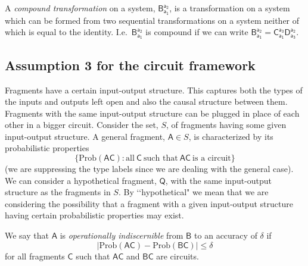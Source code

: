 \documentclass[10pt]{article}
\begin{document}
A \emph{compound transformation} on a system, $\mathsf{B_{a_1}^{a_2}}$,  is a transformation on a system which can be formed from two sequential transformations on a system neither of which is equal to the identity.  I.e.\ $\mathsf{B_{a_1}^{a_2}}$ is compound if we can write $\mathsf{B_{a_1}^{a_2}}=\mathsf{C_{a_1}^{a_3}} \mathsf{D_{a_3}^{a_2}}$.


\subsection{Assumption 3 for the circuit framework}\label{assumptionthreesec}

Fragments have a certain input-output structure. This captures both the types of the inputs and outputs left open and also the causal structure between them.  Fragments with the same input-output structure can be plugged in place of each other in a bigger circuit.  Consider the set, $S$, of fragments having some given input-output structure.
A general fragment, $\mathsf{A} \in S$, is characterized by its probabilistic properties
\begin{equation}
\{\text{Prob}(\mathsf{AC}): \text{all}~\mathsf{C}~\text{such that}~ \mathsf{AC}~\text{is a circuit}\}
\end{equation}
(we are suppressing the type labels since we are dealing with the general case).
We can consider a hypothetical fragment, $\mathsf{Q}$, with the same input-output structure as the fragments in $S$. By \lq\lq hypothetical" we mean that we are considering the possibility that a fragment with a given input-output structure having certain probabilistic properties may exist.

We say that $\mathsf{A}$ is \emph{operationally indiscernible} from $\mathsf{B}$ to an accuracy of $\delta$ if
\begin{equation}
|\text{Prob}(\mathsf{AC}) - \text{Prob}(\mathsf{BC})| \leq \delta
\end{equation}
for all fragments $\mathsf C$ such that $\mathsf{AC}$ and $\mathsf{BC}$ are circuits.
\end{document}
